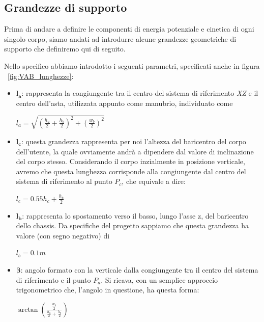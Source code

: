 \subsection{Grandezze di supporto}
Prima di andare a definire le componenti di energia potenziale e cinetica di ogni singolo corpo, siamo andati ad introdurre alcune grandezze geometriche di supporto che definiremo qui di seguito.

Nello specifico abbiamo introdotto i seguenti parametri, specificati anche in figura ~\ref{fig:VAB_lunghezze}:
\begin{itemize}
	\item $\mathbf{l_a}$: rappresenta la congiungente tra il centro del sistema di riferimento \textit{XZ} e il centro dell'asta, utilizzata appunto come manubrio, individuato come
	\begin{center}
		{$l_a = \sqrt{(\frac{h_a}{2} + \frac{h_b}{2})^2 + (\frac{w_b}{2})^2}$}
	\end{center}
	\item $\mathbf{l_c}$: questa grandezza rappresenta per noi l'altezza del baricentro del corpo dell'utente, la quale ovviamente andrà a dipendere dal valore di inclinazione del corpo stesso.
	Considerando il corpo inzialmente in posizione verticale, avremo che questa lunghezza corrisponde alla congiungente dal centro del sistema di riferimento al punto $P_c$, che equivale a dire:
	\begin{center}
		$l_c = 0.55 h_c + \frac{h_b}{2}$
	\end{center}
	\item $\mathbf{l_b}$: rappresenta lo spostamento verso il basso, lungo l'asse z, del baricentro dello chassis. Da specifiche del progetto sappiamo che questa grandezza ha valore (con segno negativo) di
	\begin{center}
		$l_b = 0.1 m$
	\end{center}
	\item $\mathbf{\beta}$: angolo formato con la verticale dalla congiungente tra il centro del sistema di riferimento e il punto $P_a$. Si ricava, con un semplice approccio trigonometrico che, l'angolo in questione, ha questa forma:
	\begin{center}
		$\arctan{(\frac{\frac{w_b}{2}}{\frac{h_a}{2} + \frac{h_b}{2}})}$
	\end{center}
\end{itemize}

